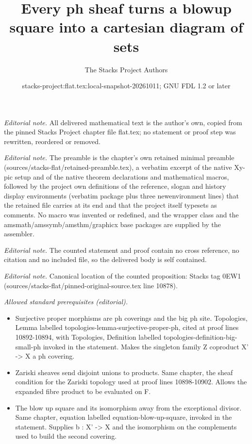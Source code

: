 \documentclass[10pt,a4paper]{amsart}
\title{Every ph sheaf turns a blowup square into a cartesian diagram of sets}
\author{The Stacks Project Authors}
\date{stacks-project:flat.tex:local-snapshot-20261011; GNU FDL 1.2 or later}
\theoremstyle{plain}
\theoremstyle{definition}
\theoremstyle{remark}
\numberwithin{equation}{subsection}
\begin{document}
\maketitle
\noindent\textit{Editorial note.} All delivered mathematical text is the author's own, copied from the pinned Stacks Project chapter file flat.tex; no statement or proof step was rewritten, reordered or removed.\par\medskip
\noindent\textit{Editorial note.} The preamble is the chapter's own retained minimal preamble (sources/stacks-flat/retained-preamble.tex), a verbatim excerpt of the native Xy-pic setup and of the native theorem declarations and mathematical macros, followed by the project own definitions of the reference, slogan and history display environments (verbatim package plus three newenvironment lines) that the retained file carries at its end and that the project itself typesets as comments. No macro was invented or redefined, and the wrapper class and the amsmath/amssymb/amsthm/graphicx base packages are supplied by the assembler.\par\medskip
\noindent\textit{Editorial note.} The counted statement and proof contain no cross reference, no citation and no included file, so the delivered body is self contained.\par\medskip
\noindent\textit{Editorial note.} Canonical location of the counted proposition: Stacks tag 0EW1 (sources/stacks-flat/pinned-original-source.tex line 10878).\par\medskip
\noindent\textit{Allowed standard prerequisites (editorial).}\begin{itemize}
\item Surjective proper morphisms are ph coverings and the big ph site. Topologies, Lemma labelled topologies-lemma-surjective-proper-ph, cited at proof lines 10892-10894, with Topologies, Definition labelled topologies-definition-big-small-ph invoked in the statement. Makes the singleton family Z coproduct X' -> X a ph covering.
\item Zariski sheaves send disjoint unions to products. Same chapter, the sheaf condition for the Zariski topology used at proof lines 10898-10902. Allows the expanded fibre product to be evaluated on F.
\item The blow up square and its isomorphism away from the exceptional divisor. Same chapter, equation labelled equation-blow-up-square, invoked in the statement. Supplies b : X' -> X and the isomorphism on the complements used to build the second covering.
\end{itemize}\medskip
\end{document}
